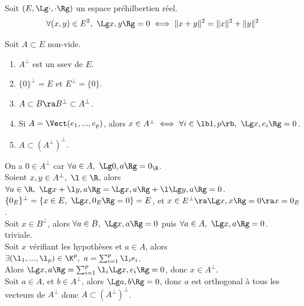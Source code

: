\documentclass[11pt]{article}
\begin{document}
\vspace*{-0.8cm}

\begin{thm}{}{}
    Soit $(E,\Lg\cdot,\cdot\Rg)$ un espace préhilbertien réel.
    \begin{equation*}
        \forall (x, y) \in E^2, ~ \Lg x, y \Rg = 0 \iff \| x + y \|^2 = \| x \|^2 + \| y \|^2
    \end{equation*}
\end{thm}

\vspace*{-0.8cm}

\begin{thm}{}{}
    Soit $A\subset E$ non-vide.
    \begin{enumerate}
        \item $A^\bot$ est un ssev de $E$.
        \item $\{0\}^\bot = E$ et $E^\bot = \{0\}$.
        \item $A\subset B \ra B^\bot \subset A^\bot$.
        \item Si $A=\Vect(e_1,...,e_p)$, alors $x\in A^\bot \iff \forall i \in \lb1,p\rb, ~ \Lg x, e_i \Rg = 0$.
        \item $A\subset \left(A^\bot\right)^\bot$.
    \end{enumerate}
    \tcblower
     On a $0\in A^\bot$ car $\forall a \in A, ~ \Lg 0, a\Rg = 0_\R$.\\
    Soient $x,y \in A^\bot, ~ \l \in \R$, alors $\forall a \in \R, ~ \Lg x + \l y, a \Rg = \Lg x, a \Rg + \l \Lg y, a \Rg = 0$.\\
     $\{0_E\}^\bot = \{ x \in E, ~ \Lg x,0_E\Rg = 0 \} = E$, et $x\in E^\bot \ra \Lg x,x\Rg = 0 \ra x=0_E$.\\
     Soit $x\in B^\bot$, alors $\forall a \in B, ~ \Lg x,a\Rg = 0$ puis $\forall a \in A, ~ \Lg x, a \Rg = 0$.\\
     triviale.\\
     Soit $x$ vérifiant les hypothèses et $a\in A$, alors $\exists (\l_1,...,\l_p)\in\K^p, ~ a=\sum_{i=1}^p \l_i e_i$.\\
    Alors $\Lg x,a\Rg = \sum_{i=1}^p \l_i\Lg x,e_i\Rg=0$, donc $x\in A^\bot$.\\
     Soit $a\in A$, et $b\in A^\bot$, alors $\Lg a, b \Rg = 0$, donc $a$ est orthogonal à tous les vecteurs de $A^\bot$ donc $A\subset (A^\bot)^\bot$.
\end{thm}

\vspace*{-0.8cm}
\end{document}
